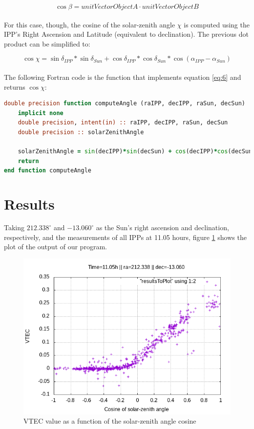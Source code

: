 \begin{equation} \label{eq:5}
\cos \beta = unitVectorObjectA \cdot unitVectorObjectB
\end{equation}\\

For this case, though, the cosine of the solar-zenith angle $\chi$ is computed using the IPP's Right Ascension and Latitude (equivalent to declination). The previous dot product can be simplified to:

\begin{equation} \label{eq:6}
\cos \chi = \sin\delta_{IPP}*\sin\delta_{Sun} + \cos\delta_{IPP}*\cos\delta_{Sun}*\cos(\alpha_{IPP} - \alpha_{Sun})
\end{equation}\\

The following Fortran code is the function that implements equation \ref{eq:6} and returns $\cos \chi$:

\begin{minipage}{\linewidth}
\begin{lstlisting}[language=Fortran, caption=Computation of the solar-zenith a angle's cosine]
double precision function computeAngle (raIPP, decIPP, raSun, decSun)
	implicit none
	double precision, intent(in) :: raIPP, decIPP, raSun, decSun
	double precision :: solarZenithAngle
	
	solarZenithAngle = sin(decIPP)*sin(decSun) + cos(decIPP)*cos(decSun)*cos(raIPP - raSun)
	return
end function computeAngle
\end{lstlisting}
\end{minipage}

\section{Results}

Taking $212.338^{\circ}$ and $-13.060^{\circ}$ as the Sun's right ascension and declination, respectively, and the measurements of all IPPs at 11.05 hours, figure \ref{fig:results} shows the plot of the output of our program.

\begin{figure}[!htb]
\begin{centering}
	\includegraphics[width=0.5\linewidth]{images/ch4/resultSunTest.png}
	\caption{VTEC value as a function of the solar-zenith angle cosine}
	\label{fig:results}
\end{centering}
\end{figure}


